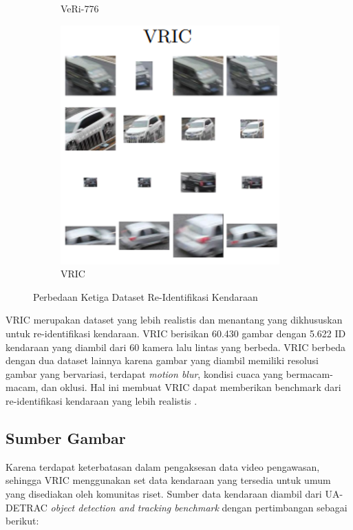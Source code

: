 \begin{figure}[h!]
\begin{subfigure}{.33\textwidth}
    \caption{VeRi-776}
    \label{fig:veri776}
  \end{subfigure}
  \begin{subfigure}{.33\textwidth}
    \centering
    \includegraphics[width=.9\linewidth]{gambar/VRIC.png}
    \caption{VRIC}
    \label{fig:vric}
  \end{subfigure}%
  \caption{Perbedaan Ketiga Dataset Re-Identifikasi Kendaraan}
  \label{fig:perbedaanketigadatasetreidentifikasikendaraan}
\end{figure}

VRIC merupakan dataset yang lebih realistis dan menantang yang dikhususkan untuk re-identifikasi kendaraan. VRIC berisikan 60.430 gambar dengan 5.622 ID kendaraan yang diambil dari 60 
kamera lalu lintas yang berbeda. VRIC berbeda dengan dua dataset lainnya karena gambar yang diambil memiliki resolusi gambar yang bervariasi, terdapat \emph{motion blur}, kondisi 
cuaca yang bermacam-macam, dan oklusi. Hal ini membuat VRIC dapat memberikan benchmark dari re-identifikasi kendaraan yang lebih realistis \parencite{Kanaci2018}.

\subsection{Sumber Gambar}

Karena terdapat keterbatasan dalam pengaksesan data video pengawasan, sehingga VRIC menggunakan set data kendaraan yang tersedia untuk umum yang disediakan oleh komunitas riset. Sumber 
data kendaraan diambil dari UA-DETRAC \emph{object detection and tracking benchmark} dengan pertimbangan sebagai berikut:

